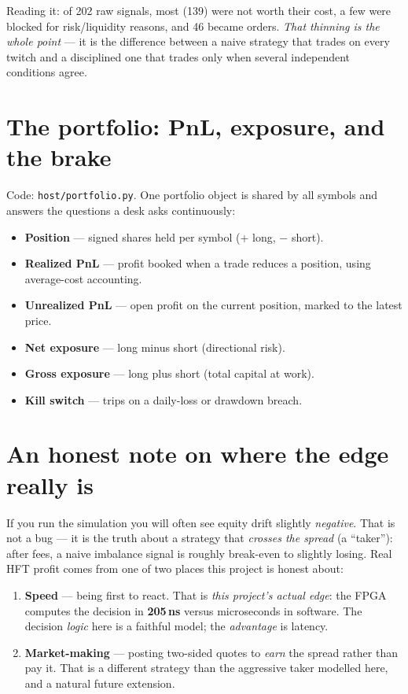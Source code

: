 \documentclass[10pt,a4paper]{article}
\newcommand{\code}[1]{\texttt{\small #1}}
\begin{document}
Reading it: of 202 raw signals, most (139) were not worth their cost, a few were
blocked for risk/liquidity reasons, and 46 became orders. \emph{That thinning is the
whole point} --- it is the difference between a naive strategy that trades on every
twitch and a disciplined one that trades only when several independent conditions
agree.

\section{The portfolio: PnL, exposure, and the brake}
\label{sec:portfolio}

Code: \code{host/portfolio.py}. One portfolio object is shared by all symbols and
answers the questions a desk asks continuously:
\begin{itemize}[leftmargin=1.4em, itemsep=1pt]
  \item \textbf{Position} --- signed shares held per symbol (+ long, $-$ short).
  \item \textbf{Realized PnL} --- profit booked when a trade reduces a position,
  using average-cost accounting.
  \item \textbf{Unrealized PnL} --- open profit on the current position, marked to
  the latest price.
  \item \textbf{Net exposure} --- long minus short (directional risk).
  \item \textbf{Gross exposure} --- long plus short (total capital at work).
  \item \textbf{Kill switch} --- trips on a daily-loss or drawdown breach.
\end{itemize}

\section{An honest note on where the edge really is}

If you run the simulation you will often see equity drift slightly \emph{negative}.
That is not a bug --- it is the truth about a strategy that \emph{crosses the spread}
(a ``taker''): after fees, a naive imbalance signal is roughly break-even to slightly
losing. Real HFT profit comes from one of two places this project is honest about:
\begin{enumerate}[leftmargin=1.4em, itemsep=1pt]
  \item \textbf{Speed} --- being first to react. That is \emph{this project's actual
  edge}: the FPGA computes the decision in \textbf{205\,ns} versus microseconds in
  software. The decision \emph{logic} here is a faithful model; the \emph{advantage}
  is latency.
  \item \textbf{Market-making} --- posting two-sided quotes to \emph{earn} the spread
  rather than pay it. That is a different strategy than the aggressive taker modelled
  here, and a natural future extension.
\end{enumerate}
\end{document}
